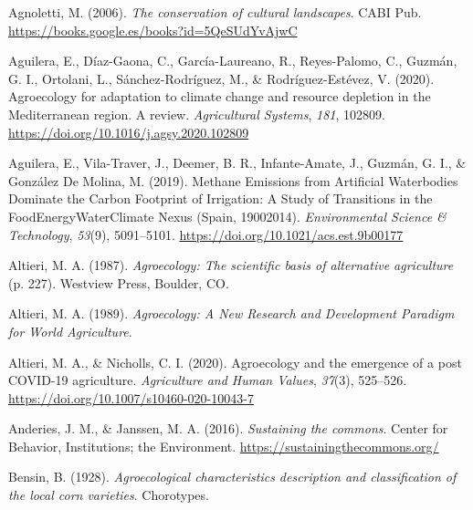 \documentclass[a4paper, nobind]{templates/ociamthesis}
\newlength{\cslhangindent}
\newenvironment{CSLReferences}[2] %
 {%
  \setlength{\parindent}{0pt}
  \ifodd #1
  \let\oldpar\par
  \def\par{\hangindent=\cslhangindent\oldpar}
  \fi
  \setlength{\parskip}{1mm}
  \setlength{\baselineskip}{6mm}
 }%
 {}
\begin{document}

\hypertarget{refs}{}
\begin{CSLReferences}{1}{0}
\leavevmode{}%
Agnoletti, M. (2006). \emph{The conservation of cultural landscapes}. CABI Pub. \url{https://books.google.es/books?id=5QeSUdYvAjwC}

\leavevmode{}%
Aguilera, E., Díaz-Gaona, C., García-Laureano, R., Reyes-Palomo, C., Guzmán, G. I., Ortolani, L., Sánchez-Rodríguez, M., \& Rodríguez-Estévez, V. (2020). Agroecology for adaptation to climate change and resource depletion in the Mediterranean region. A review. \emph{Agricultural Systems}, \emph{181}, 102809. \url{https://doi.org/10.1016/j.agsy.2020.102809}

\leavevmode{}%
Aguilera, E., Vila-Traver, J., Deemer, B. R., Infante-Amate, J., Guzmán, G. I., \& González De Molina, M. (2019). Methane Emissions from Artificial Waterbodies Dominate the Carbon Footprint of Irrigation: A Study of Transitions in the Food{\textendash}Energy{\textendash}Water{\textendash}Climate Nexus (Spain, 1900{\textendash}2014). \emph{Environmental Science \& Technology}, \emph{53}(9), 5091--5101. \url{https://doi.org/10.1021/acs.est.9b00177}

\leavevmode{}%
Altieri, M. A. (1987). \emph{Agroecology: The scientific basis of alternative agriculture} (p. 227). Westview Press, Boulder, CO.

\leavevmode{}%
Altieri, M. A. (1989). \emph{Agroecology: A New Research and Development Paradigm for World Agriculture}.

\leavevmode{}%
Altieri, M. A., \& Nicholls, C. I. (2020). Agroecology and the emergence of a post COVID-19 agriculture. \emph{Agriculture and Human Values}, \emph{37}(3), 525--526. \url{https://doi.org/10.1007/s10460-020-10043-7}

\leavevmode{}%
Anderies, J. M., \& Janssen, M. A. (2016). \emph{Sustaining the commons}. Center for Behavior, Institutions; the Environment. \url{https://sustainingthecommons.org/}

\leavevmode{}%
Bensin, B. (1928). \emph{Agroecological characteristics description and classification of the local corn varieties}. Chorotypes.


\end{CSLReferences}
\end{document}
